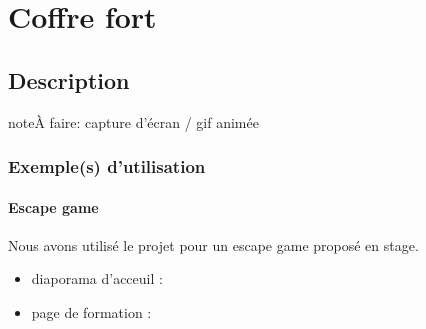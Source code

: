 \documentclass[letterpaper,10pt,french]{sphinxmanual}
\begin{document}
\begin{sphinxVerbatim}[commandchars=\\\{\},numbers=left,firstnumber=1,stepnumber=1]
     
    
     
          
\end{sphinxVerbatim}


\section{Coffre fort}
\label{\detokenize{projets/coffre::doc}}\label{\detokenize{projets/coffre:coffre-fort}}\label{\detokenize{projets/coffre:projetcoffre}}

\subsection{Description}
\label{\detokenize{projets/coffre:description}}
\begin{sphinxadmonition}{note}{\label{projets/coffre:index-0}À faire:}
capture d’écran / gif animée
\end{sphinxadmonition}


\subsubsection{Exemple(s) d’utilisation}
\label{\detokenize{projets/coffre:exemple-s-d-utilisation}}

\paragraph{Escape game}
\label{\detokenize{projets/coffre-exemple-escape:escape-game}}\label{\detokenize{projets/coffre-exemple-escape::doc}}
Nous avons utilisé le projet {\hyperref[\detokenize{projets/coffre:projetcoffre}]{}} pour un escape
game proposé en stage.
\begin{itemize}
\item {} 
diaporama d’acceuil : 

\item {} 
page de formation : 

\end{itemize}
\end{document}
